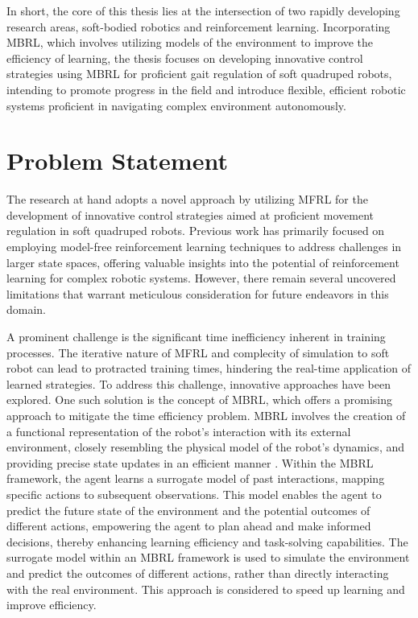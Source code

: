 In short, the core of this thesis lies at the intersection of two rapidly developing research areas, soft-bodied robotics and reinforcement learning. Incorporating \ac{MBRL}, which involves utilizing models of the environment to improve the efficiency of learning, the thesis focuses on developing innovative control strategies using \ac{MBRL} for proficient gait regulation of soft quadruped robots, intending to promote progress in the field and introduce flexible, efficient robotic systems proficient in navigating complex environment autonomously.

\section{Problem Statement}
The research at hand adopts a novel approach by utilizing \ac{MFRL} for the development of innovative control strategies aimed at proficient movement regulation in soft quadruped robots\cite{jiSynthesizingOptimalGait2022}. Previous work has primarily focused on employing model-free reinforcement learning techniques to address challenges in larger state spaces, offering valuable insights into the potential of reinforcement learning for complex robotic systems. However, there remain several uncovered limitations that warrant meticulous consideration for future endeavors in this domain.

A prominent challenge is the significant time inefficiency inherent in training processes. The iterative nature of \ac{MFRL} and complecity of simulation to soft robot can lead to protracted training times, hindering the real-time application of learned strategies\cite{jiSynthesizingOptimalGait2022}. To address this challenge, innovative approaches have been explored. One such solution is the concept of \ac{MBRL}, which offers a promising approach to mitigate the time efficiency problem. MBRL involves the creation of a functional representation of the robot's interaction with its external environment, closely resembling the physical model of the robot's dynamics, and providing precise state updates in an efficient manner \cite{rayModelBasedReinforcementLearning2010}. Within the MBRL framework, the agent learns a surrogate model of past interactions, mapping specific actions to subsequent observations. This model enables the agent to predict the future state of the environment and the potential outcomes of different actions, empowering the agent to plan ahead and make informed decisions, thereby enhancing learning efficiency and task-solving capabilities\cite{polydorosSurveyModelBasedReinforcement2017}. The surrogate model within an MBRL framework is used to simulate the environment and predict the outcomes of different actions, rather than directly interacting with the real
environment. This approach is considered to speed up learning and improve efficiency.


